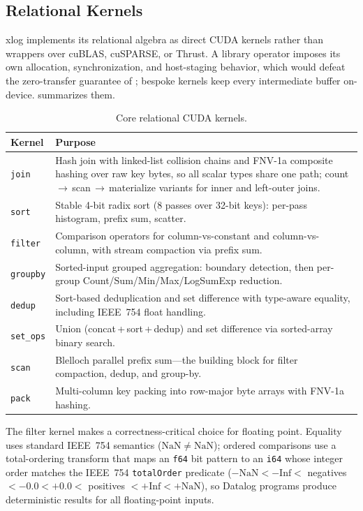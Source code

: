 \subsection{Relational Kernels}

xlog implements its relational algebra as direct CUDA kernels rather than wrappers over cuBLAS, cuSPARSE, or Thrust. A library operator imposes its own allocation, synchronization, and host-staging behavior, which would defeat the zero-transfer guarantee of ; bespoke kernels keep every intermediate buffer on-device.  summarizes them.

\begin{table}[htbp]
  \centering
  \caption{Core relational CUDA kernels.}
  \label{tab:kernels}
  \small
  \begin{tabularx}{\linewidth}{@{}l X@{}}
    \toprule
    \textbf{Kernel} & \textbf{Purpose} \\
    \midrule
    \texttt{join}    & Hash join with linked-list collision chains and FNV-1a composite hashing over raw key bytes, so all scalar types share one path; count\,$\to$\,scan\,$\to$\,materialize variants for inner and left-outer joins. \\
    \texttt{sort}    & Stable 4-bit radix sort (8 passes over 32-bit keys): per-pass histogram, prefix sum, scatter. \\
    \texttt{filter}  & Comparison operators for column-vs-constant and column-vs-column, with stream compaction via prefix sum. \\
    \texttt{groupby} & Sorted-input grouped aggregation: boundary detection, then per-group Count/Sum/Min/Max/LogSumExp reduction. \\
    \texttt{dedup}   & Sort-based deduplication and set difference with type-aware equality, including IEEE~754 float handling. \\
    \texttt{set\_ops} & Union (concat\,+\,sort\,+\,dedup) and set difference via sorted-array binary search. \\
    \texttt{scan}    & Blelloch parallel prefix sum---the building block for filter compaction, dedup, and group-by. \\
    \texttt{pack}    & Multi-column key packing into row-major byte arrays with FNV-1a hashing. \\
    \bottomrule
  \end{tabularx}
\end{table}

The filter kernel makes a correctness-critical choice for floating point. Equality uses standard IEEE~754 semantics ($\mathrm{NaN}\neq\mathrm{NaN}$); ordered comparisons use a total-ordering transform that maps an \texttt{f64} bit pattern to an \texttt{i64} whose integer order matches the IEEE~754 \texttt{totalOrder} predicate ($-\mathrm{NaN} < -\mathrm{Inf} < $ negatives $< -0.0 < +0.0 <$ positives $< +\mathrm{Inf} < +\mathrm{NaN}$), so Datalog programs produce deterministic results for all floating-point inputs.


